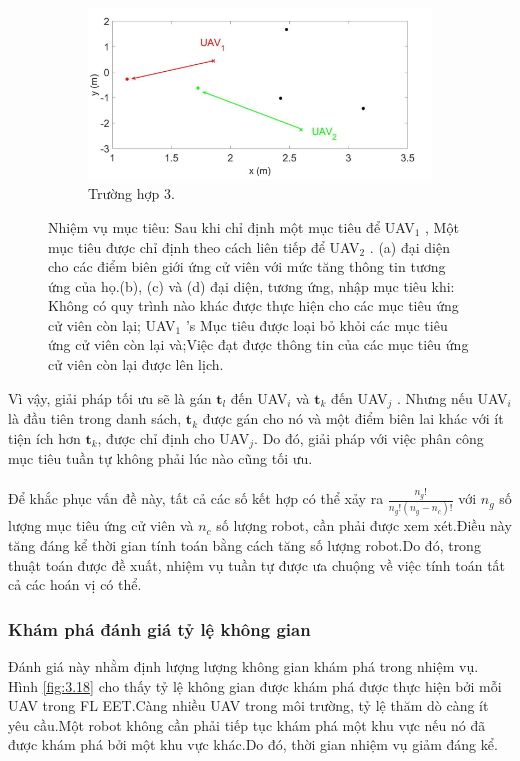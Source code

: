 \documentclass[11pt,openany]{book}
\begin{document}
\begin{algorimth}[H]
\begin{figure}[H]
\begin{subfigure}[H]{0.6\linewidth}
        \label{fig:3.17c}
    \end{subfigure}
    \begin{subfigure}[H]{0.6\linewidth}
        \includegraphics[chiều rộng=\linewidth]{assets/3_17_c.png}
        \caption{{Trường hợp 3.}}
        \label{fig:3.17d}
    \end{subfigure}
    \caption{Nhiệm vụ mục tiêu: Sau khi chỉ định một mục tiêu để UAV$_1$ , Một mục tiêu được chỉ định theo cách liên tiếp để UAV$_2$ . (a) đại diện cho các điểm biên giới ứng cử viên với mức tăng thông tin tương ứng của họ.(b), (c) và (d) đại diện, tương ứng, nhập mục tiêu khi: Không có quy trình nào khác được thực hiện cho các mục tiêu ứng cử viên còn lại; UAV$_1$ ’s Mục tiêu được loại bỏ khỏi các mục tiêu ứng cử viên còn lại và;Việc đạt được thông tin của các mục tiêu ứng cử viên còn lại được lên lịch.}
    \label{fig:3.17}
\end{figure}
Vì vậy, giải pháp tối ưu sẽ là gán $\mathbf{t}_l$ đến UAV$_i$ và $\mathbf{t}_k$ đến UAV$_j$ . Nhưng nếu UAV$_i$ là đầu tiên trong danh sách, $\mathbf{t}_k$ được gán cho nó và một điểm biên lai khác với ít tiện ích hơn $\mathbf{t}_k$, được chỉ định cho UAV$_j$. Do đó, giải pháp với việc phân công mục tiêu tuần tự không phải lúc nào cũng tối ưu.\\\\
Để khắc phục vấn đề này, tất cả các số kết hợp có thể xảy ra $\frac{n_g!}{n_g!(n_g-n_c)!}$ với $n_g$ số lượng mục tiêu ứng cử viên và $n_c$ số lượng robot, cần phải được xem xét.Điều này tăng đáng kể thời gian tính toán bằng cách tăng số lượng robot.Do đó, trong thuật toán được đề xuất, nhiệm vụ tuần tự được ưa chuộng về việc tính toán tất cả các hoán vị có thể.
\subsubsection{Khám phá đánh giá tỷ lệ không gian}
Đánh giá này nhằm định lượng lượng không gian khám phá trong nhiệm vụ. Hình \ref{fig:3.18} cho thấy tỷ lệ không gian được khám phá được thực hiện bởi mỗi UAV trong FL EET.Càng nhiều UAV trong môi trường, tỷ lệ thăm dò càng ít yêu cầu.Một robot không cần phải tiếp tục khám phá một khu vực nếu nó đã được khám phá bởi một khu vực khác.Do đó, thời gian nhiệm vụ giảm đáng kể.

\end{algorimth}
\end{document}
